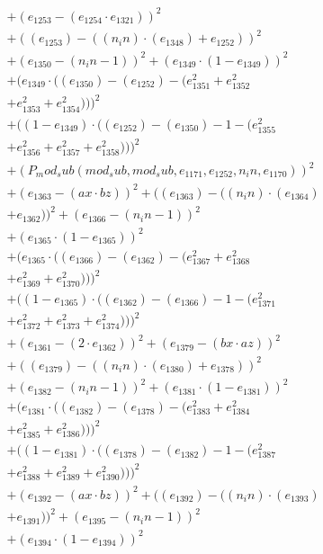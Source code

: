 \documentclass[10pt, a4paper]{article}
\begin{document}
\begin{align*}
& + (e_{1253} - (e_{1254}  \cdot  e_{1321}))^{2} \\
& + ((e_{1253}) - ((n_in)  \cdot  (e_{1348}) + e_{1252}))^{2} \\
& + (e_{1350} - (n_in - 1))^{2} + (e_{1349}  \cdot  (1 - e_{1349}))^{2} \\
& + (e_{1349}  \cdot  ((e_{1350}) - (e_{1252}) - (e_{1351}^{2} + e_{1352}^{2} \\
& + e_{1353}^{2} + e_{1354}^{2})))^{2} \\
& + ((1 - e_{1349})  \cdot  ((e_{1252}) - (e_{1350}) - 1 - (e_{1355}^{2} \\
& + e_{1356}^{2} + e_{1357}^{2} + e_{1358}^{2})))^{2} \\
& + (P_mod_sub(mod_sub, mod_sub, e_{1171}, e_{1252}, n_in, e_{1170}))^{2} \\
& + (e_{1363} - (ax  \cdot  bz))^{2} + ((e_{1363}) - ((n_in)  \cdot  (e_{1364}) \\
& + e_{1362}))^{2} + (e_{1366} - (n_in - 1))^{2} \\
& + (e_{1365}  \cdot  (1 - e_{1365}))^{2} \\
& + (e_{1365}  \cdot  ((e_{1366}) - (e_{1362}) - (e_{1367}^{2} + e_{1368}^{2} \\
& + e_{1369}^{2} + e_{1370}^{2})))^{2} \\
& + ((1 - e_{1365})  \cdot  ((e_{1362}) - (e_{1366}) - 1 - (e_{1371}^{2} \\
& + e_{1372}^{2} + e_{1373}^{2} + e_{1374}^{2})))^{2} \\
& + (e_{1361} - (2  \cdot  e_{1362}))^{2} + (e_{1379} - (bx  \cdot  az))^{2} \\
& + ((e_{1379}) - ((n_in)  \cdot  (e_{1380}) + e_{1378}))^{2} \\
& + (e_{1382} - (n_in - 1))^{2} + (e_{1381}  \cdot  (1 - e_{1381}))^{2} \\
& + (e_{1381}  \cdot  ((e_{1382}) - (e_{1378}) - (e_{1383}^{2} + e_{1384}^{2} \\
& + e_{1385}^{2} + e_{1386}^{2})))^{2} \\
& + ((1 - e_{1381})  \cdot  ((e_{1378}) - (e_{1382}) - 1 - (e_{1387}^{2} \\
& + e_{1388}^{2} + e_{1389}^{2} + e_{1390}^{2})))^{2} \\
& + (e_{1392} - (ax  \cdot  bz))^{2} + ((e_{1392}) - ((n_in)  \cdot  (e_{1393}) \\
& + e_{1391}))^{2} + (e_{1395} - (n_in - 1))^{2} \\
& + (e_{1394}  \cdot  (1 - e_{1394}))^{2} \\

\end{align*}
\end{document}
